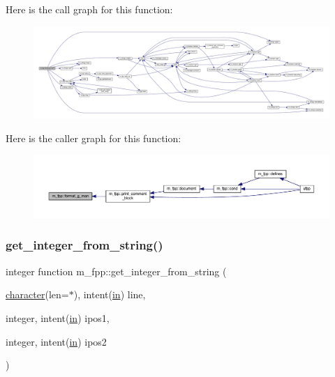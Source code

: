 Here is the call graph for this function\+:
\nopagebreak
\begin{figure}[H]
\begin{center}
\leavevmode
\includegraphics[width=350pt]{namespacem__fpp_ae366d933366dea7f28b44653b5ef04d6_cgraph}
\end{center}
\end{figure}
Here is the caller graph for this function\+:
\nopagebreak
\begin{figure}[H]
\begin{center}
\leavevmode
\includegraphics[width=350pt]{namespacem__fpp_ae366d933366dea7f28b44653b5ef04d6_icgraph}
\end{center}
\end{figure}
\mbox{\label{namespacem__fpp_a3293bb9a959675261bda2b8f6fe3fa9e}} 
\subsubsection{\texorpdfstring{get\+\_\+integer\+\_\+from\+\_\+string()}{get\_integer\_from\_string()}}
{\footnotesize\ttfamily integer function m\+\_\+fpp\+::get\+\_\+integer\+\_\+from\+\_\+string (\begin{DoxyParamCaption}\item[{\hyperlink{option__stopwatch_83_8txt_abd4b21fbbd175834027b5224bfe97e66}{character}(len=$\ast$), intent(\hyperlink{M__journal_83_8txt_afce72651d1eed785a2132bee863b2f38}{in})}]{line,  }\item[{integer, intent(\hyperlink{M__journal_83_8txt_afce72651d1eed785a2132bee863b2f38}{in})}]{ipos1,  }\item[{integer, intent(\hyperlink{M__journal_83_8txt_afce72651d1eed785a2132bee863b2f38}{in})}]{ipos2 }\end{DoxyParamCaption})}



